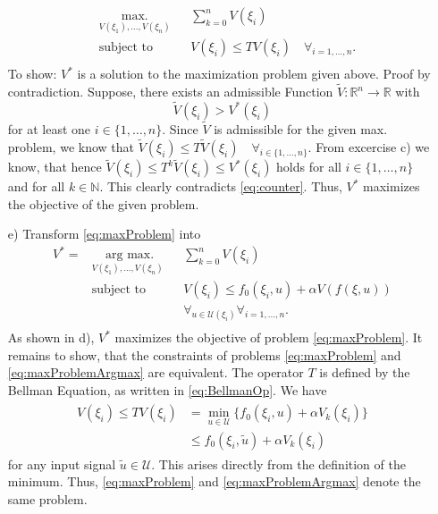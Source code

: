 \documentclass[]{article}
\newcommand{\N}{\mathbb{N}}
\newcommand{\R}{\mathbb{R}}
\newcommand{\fnull}{f_0}
\newcommand{\U}{\mathcal{U}}
\newcommand{\writeset}[1]{\{#1\}}
\newcommand{\Vk}{V_k}
\newcommand{\Vopt}{\Vind{*}}
\newcommand{\Vind}[1]{V^#1}
\newcommand{\Vtil}{\tilde{V}}
\newcommand{\util}{\tilde{u}}
\begin{document}
\begin{enumerate}
			\begin{equation} \label{eq:maxProblem}
			\begin{aligned}
			& \underset{V(\xi_1),\dots,V(\xi_n)}{\text{max.}}
			& & \sum_{k=0}^{n} V(\xi_i)\\
			& \text{subject to}
			& & V(\xi_i)  \leq TV(\xi_i)\quad\forall_{ i= 1,\dots,n}.\\
			\end{aligned}
			\end{equation}
			To show: $ \Vopt $ is a solution to the maximization problem given above.
			Proof by contradiction. Suppose, there exists an admissible Function $ \Vtil :\R^n \longrightarrow \R$ with \begin{equation}
				\Vtil(\xi_i) > \Vopt(\xi_i) \label{eq:counter}
			\end{equation}  for at least one $ i \in \writeset{1,\dots,n} $. Since $ \Vtil $ is admissible for the given max. problem, we know that $ \Vtil(\xi_i) \leq T\Vtil(\xi_i) \quad \forall_{i\in \writeset{1,\dots,n}} $. From excercise c) we know, that hence $ \Vtil(\xi_i) \leq T^k\Vtil(\xi_i) \leq \Vopt(\xi_i)$ holds for all $ i \in  \writeset{1,\dots,n} $ and for all $ k \in \N $.  This clearly contradicts \eqref{eq:counter}. Thus, $ \Vopt $ maximizes the objective of the given problem.
			
			\item[e)] Transform \eqref{eq:maxProblem} into
			\begin{equation} \label{eq:maxProblemArgmax}
				\begin{aligned}
				 \Vopt= &\underset{V(\xi_1),\dots,V(\xi_n)}{\text{ arg max.}}
				& & \sum_{k=0}^{n} V(\xi_i)\\
				& \text{subject to}
				& & V(\xi_i)  \leq \fnull (\xi_i,u)+ \alpha V(f(\xi,u))\\
				& & &\forall_{u\in \U(\xi_i)} \forall_{ i= 1,\dots,n}.\\
				\end{aligned}
			\end{equation}
			As shown in d), $ \Vopt $ maximizes the objective of problem \eqref{eq:maxProblem}. It remains to show, that the constraints of problems \eqref{eq:maxProblem} and \eqref{eq:maxProblemArgmax} are equivalent. The operator $ T $ is defined by the Bellman Equation, as written in \eqref{eq:BellmanOp}.
			We have
			\begin{align}
			\begin{split} \label{eq:ineqConstraint}
				V(\xi_i)  \leq TV(\xi_i) &= \underset{u \in \U}{\min} \writeset{\fnull(\xi_i,u) + \alpha \Vk(\xi_i)}\\
				&\leq \fnull(\xi_i,\util) + \alpha \Vk(\xi_i)
			\end{split}
			\end{align}
			for any input signal $ \util \in \U $. This arises directly from the definition of the minimum. Thus, \eqref{eq:maxProblem} and \eqref{eq:maxProblemArgmax} denote the same problem.
			

\end{enumerate}
\end{document}
